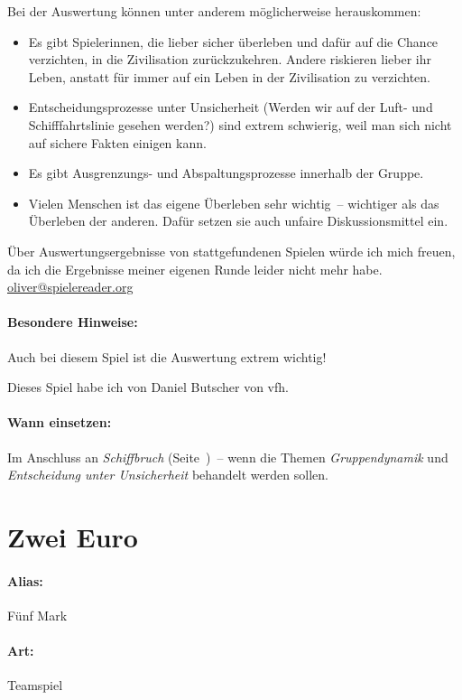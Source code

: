 Bei der Auswertung können unter anderem möglicherweise herauskommen:
\begin{itemize}
  \item Es gibt Spielerinnen, die lieber sicher überleben und dafür auf die Chance verzichten, in die Zivilisation zurückzukehren. Andere riskieren lieber ihr Leben, anstatt für immer auf ein Leben in der Zivilisation zu verzichten.
  \item Entscheidungsprozesse unter Unsicherheit (Werden wir auf der Luft- und Schifffahrtslinie gesehen werden?) sind extrem schwierig, weil man sich nicht auf sichere Fakten einigen kann.
  \item Es gibt Ausgrenzungs- und Abspaltungsprozesse innerhalb der Gruppe.
  \item Vielen Menschen ist das eigene Überleben sehr wichtig~-- wichtiger als das Überleben der anderen. Dafür setzen sie auch unfaire Diskussionsmittel ein.
\end{itemize}

Über Auswertungsergebnisse von stattgefundenen Spielen würde ich mich freuen, da ich die Ergebnisse meiner eigenen Runde leider nicht mehr habe. \url{oliver@spielereader.org}

\paragraph{Besondere Hinweise:} Auch bei diesem Spiel ist die Auswertung extrem wichtig!

Dieses Spiel habe ich von Daniel Butscher von vfh.
\paragraph{Wann einsetzen:} Im Anschluss an \emph{Schiffbruch} (Seite~\pageref{schiffbruch})~-- wenn die Themen \emph{Gruppendynamik} und \emph{Entscheidung unter Unsicherheit} behandelt werden sollen.


\section{Zwei Euro}
\paragraph{Alias:} Fünf Mark
\paragraph{Art:} Teamspiel
